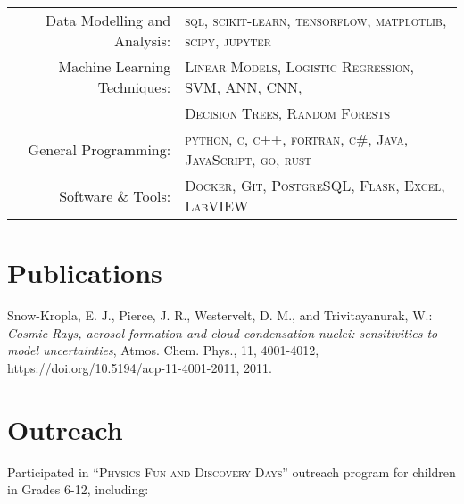 \documentclass[a4paper,11pt]{article} %
\begin{document}
\begin{tabular}{rl}

Data Modelling and Analysis: & \textsc{sql}, \textsc{scikit-learn}, \textsc{tensorflow}, \textsc{matplotlib}, \textsc{scipy}, \textsc{jupyter} \\

Machine Learning Techniques: & \textsc{Linear Models}, \textsc{Logistic Regression}, \textsc{SVM}, \textsc{ANN}, \textsc{CNN}, \\
& \textsc{Decision Trees}, \textsc{Random Forests} \\

General Programming: & \textsc{python}, \textsc{c}, \textsc{c++}, \textsc{fortran}, \textsc{c\#}, \textsc{Java}, \textsc{JavaScript}, \textsc{go}, \textsc{rust} \\

Software \& Tools: & \textsc{Docker}, \textsc{Git}, \textsc{PostgreSQL}, \textsc{Flask}, \textsc{Excel}, \textsc{LabVIEW} \\
\end{tabular}


\section{Publications}
Snow-Kropla, E. J., Pierce, J. R., Westervelt, D. M., and Trivitayanurak, W.: \emph{Cosmic Rays, aerosol formation and cloud-condensation nuclei: sensitivities to model uncertainties}, Atmos. Chem. Phys., 11, 4001-4012, https://doi.org/10.5194/acp-11-4001-2011, 2011.


\section{Outreach}
Participated in \textsc{``Physics Fun and Discovery Days''} outreach program for children in Grades 6-12, including:\\
\end{document}
